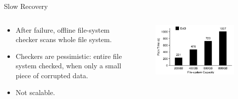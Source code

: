 \documentclass[aspectratio=169]{beamer}
\newcommand{\bi}{\begin{itemize}}
\newcommand{\ei}{\end{itemize}}
\begin{document}
\begin{frame}{Slow Recovery}
    \begin{columns}[T]
        \begin{column}{0.4\textwidth}
        \bi
    \item After failure, offline file-system checker scans whole file system.
    \item Checkers are pessimistic: entire file system checked, when only a small
        piece of corrupted data.
    \item Not scalable.
        \ei
    \end{column}
    \begin{column}{0.2\textwidth}
        \pause
        \begin{figure}
            \includegraphics[scale=0.3]{./figures/fig1.png}
        \end{figure}
    \end{column}
    \end{columns}
\end{frame}
\end{document}
